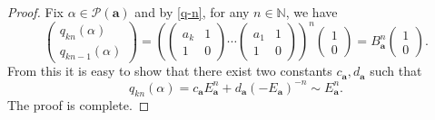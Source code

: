 \documentclass[10pt,a4paper]{amsart}
\newcommand{\ma}{\mathbf{a}}
\begin{document}
\begin{proof}
		Fix $\alpha\in\mathcal{P}(\ma)$ and by \eqref{q-n}, for any $n\in{\mathbb{N}%
		}$, we have 
		\begin{equation*}
			\left( 
			\begin{array}{c}
				q_{kn}(\alpha) \\ 
				q_{kn-1}(\alpha)
			\end{array}
			\right)=\left(\left( 
			\begin{array}{cc}
				a_k & 1 \\ 
				1 & 0%
			\end{array}
			\right)\cdots\left( 
			\begin{array}{cc}
				a_1 & 1 \\ 
				1 & 0%
			\end{array}
			\right)\right)^n\left( 
			\begin{array}{c}
				1 \\ 
				0%
			\end{array}
			\right)=B_{\ma}^n\left( 
			\begin{array}{c}
				1 \\ 
				0%
			\end{array}
			\right).
		\end{equation*}
		From this it is easy to show that there exist two constants $c_{\mathbf{a}%
		},d_{\mathbf{a}}$ such that 
		\begin{equation*}
			q_{kn}(\alpha)=c_{\mathbf{a}}E_{\mathbf{a}}^n+d_{\mathbf{a}}(-E_{\mathbf{a}%
			})^{-n}\sim E_{\mathbf{a}}^{n}. \label{qE}
		\end{equation*}
		The proof is complete.
	\end{proof}
\end{document}

